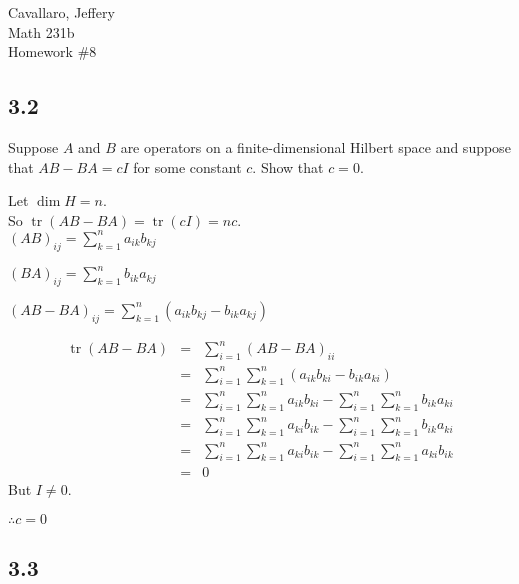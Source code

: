\documentclass[letterpaper,12pt,fleqn]{article}
\DeclareMathOperator{\tr}{tr}
\begin{document}
Cavallaro, Jeffery \\
Math 231b \\
Homework \#8

\subsection*{3.2}

Suppose $A$ and $B$ are operators on a finite-dimensional Hilbert space and
suppose that $AB-BA=cI$ for some constant $c$. Show that $c=0$.

Let $\dim H=n$. \\
So $\tr(AB-BA)=\tr(cI)=nc$. \\

$(AB)_{ij}=\sum_{k=1}^na_{ik}b_{kj}$

$(BA)_{ij}=\sum_{k=1}^nb_{ik}a_{kj}$

$(AB-BA)_{ij}=\sum_{k=1}^n(a_{ik}b_{kj}-b_{ik}a_{kj})$

\begin{eqnarray*}
  \tr(AB-BA) &=& \sum_{i=1}^n(AB-BA)_{ii} \\
  &=& \sum_{i=1}^n\sum_{k=1}^n(a_{ik}b_{ki}-b_{ik}a_{ki}) \\
  &=& \sum_{i=1}^n\sum_{k=1}^na_{ik}b_{ki}-\sum_{i=1}^n\sum_{k=1}^nb_{ik}a_{ki} \\
  &=& \sum_{i=1}^n\sum_{k=1}^na_{ki}b_{ik}-\sum_{i=1}^n\sum_{k=1}^nb_{ik}a_{ki} \\
  &=& \sum_{i=1}^n\sum_{k=1}^na_{ki}b_{ik}-\sum_{i=1}^n\sum_{k=1}^na_{ki}b_{ik} \\
  &=& 0
\end{eqnarray*}
But $I\ne0$.

$\therefore c=0$

\subsection*{3.3}
\end{document}
